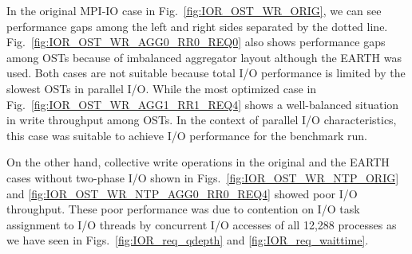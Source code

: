 \documentclass{jhps}
\begin{document}
In the original MPI-IO case in Fig.~\ref{fig:IOR_OST_WR_ORIG},
we can see performance gaps among the left and right sides separated by
the dotted line.
Fig.~\ref{fig:IOR_OST_WR_AGG0_RR0_REQ0}
also shows performance gaps among OSTs
because of imbalanced aggregator layout although the EARTH was used.
Both cases are not suitable because total I/O performance is limited
by the slowest OSTs in parallel I/O.
While the most optimized case in
Fig.~\ref{fig:IOR_OST_WR_AGG1_RR1_REQ4}
shows a well-balanced situation in write throughput among OSTs.
In the context of parallel I/O characteristics, this case was suitable
to achieve I/O performance for the benchmark run.

On the other hand, collective write operations 
in the original and the EARTH cases without two-phase I/O
shown in Figs.~\ref{fig:IOR_OST_WR_NTP_ORIG} and
\ref{fig:IOR_OST_WR_NTP_AGG0_RR0_REQ4} showed
poor I/O throughput.
These poor performance was due to contention on I/O task assignment
to I/O threads by concurrent I/O accesses of all 12,288 processes
as we have seen in Figs.~\ref{fig:IOR_req_qdepth}
and \ref{fig:IOR_req_waittime}.
\end{document}

